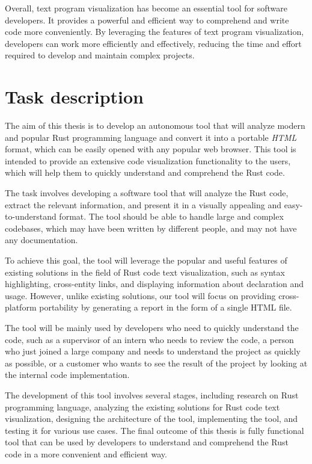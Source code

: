 Overall, text program visualization has become an essential tool for software developers. It provides a powerful and efficient way to comprehend and write code more conveniently. By leveraging the features of text program visualization, developers can work more efficiently and effectively, reducing the time and effort required to develop and maintain complex projects.

\section{Task description}

The aim of this thesis is to develop an autonomous tool that will analyze modern and popular Rust programming language and convert it into a portable \textit{HTML} format, which can be easily opened with any popular web browser. This tool is intended to provide an extensive code visualization functionality to the users, which will help them to quickly understand and comprehend the Rust code.

The task involves developing a software tool that will analyze the Rust code, extract the relevant information, and present it in a visually appealing and easy-to-understand format. The tool should be able to handle large and complex codebases, which may have been written by different people, and may not have any documentation.

To achieve this goal, the tool will leverage the popular and useful features of existing solutions in the field of Rust code text visualization, such as syntax highlighting, cross-entity links, and displaying information about declaration and usage. However, unlike existing solutions, our tool will focus on providing cross-platform portability by generating a report in the form of a single HTML file.

The tool will be mainly used by developers who need to quickly understand the code, such as a supervisor of an intern who needs to review the code, a person who just joined a large company and needs to understand the project as quickly as possible, or a customer who wants to see the result of the project by looking at the internal code implementation.

The development of this tool involves several stages, including research on Rust programming language, analyzing the existing solutions for Rust code text visualization, designing the architecture of the tool, implementing the tool, and testing it for various use cases. The final outcome of this thesis is fully functional tool that can be used by developers to understand and comprehend the Rust code in a more convenient and efficient way.

